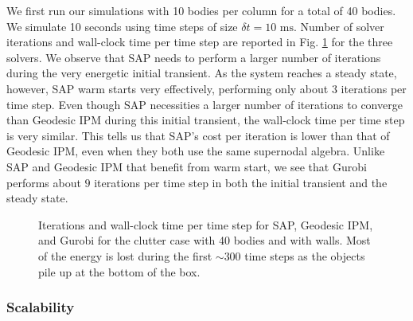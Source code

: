 We first run our simulations with 10 bodies per column for a total of 40 bodies.
We simulate 10 seconds using time steps of size $\delta t = 10\text{ ms}$.
Number of solver iterations and wall-clock time per time step are reported in
Fig. \ref{fig:clutter_w_walls_nb40} for the three solvers. We observe that SAP
needs to perform a larger number of iterations during the very energetic initial
transient. As the system reaches a steady state, however, SAP warm starts very
effectively, performing only about $3$ iterations per time step. Even though
SAP necessities a larger number of iterations to converge than Geodesic IPM during this initial transient, the wall-clock time per time step is very
similar. This tells us that SAP's cost per iteration is lower than that of
Geodesic IPM, even when they both use the same supernodal algebra. Unlike SAP and Geodesic IPM that benefit from warm start, we see that Gurobi performs
about $9$ iterations per time step in both the initial transient and the steady state.

\begin{figure}[!h]
	\centering
	\caption{\label{fig:clutter_w_walls_nb40} 
	Iterations and wall-clock time per time step for SAP, Geodesic IPM, and
	Gurobi for the clutter case with 40 bodies and with walls. Most of the
	energy is lost during the first $\sim300$ time steps as the objects pile up
	at the bottom of the box.}
\end{figure}

\subsubsection{Scalability}

